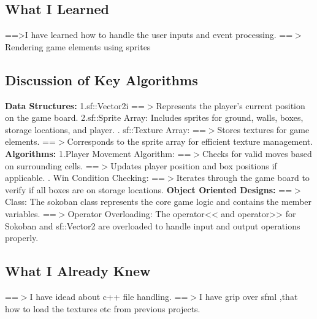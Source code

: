 \documentclass[12pt]{article}
\begin{document}
\subsection{What I Learned}
==>I have learned how to handle the user inputs and event processing.
\newline
==$>$Rendering game elements using sprites
\subsection{Discussion of Key Algorithms}
\textbf{Data Structures:}
\newline
1.sf::Vector2i 
\newline
==$>$Represents the player's current position on the game board.
\newline
2.sf::Sprite Array:
\newline
Includes sprites for ground, walls, boxes, storage locations, and player.
. sf::Texture Array:
\newline
==$>$Stores textures for game elements.
\newline
==$>$Corresponds to the sprite array for efficient texture management.
\newline
\textbf{Algorithms:}
\newline
1.Player Movement Algorithm:
\newline
==$>$Checks for valid moves based on surrounding cells.
\newline
==$>$Updates player position and box positions if applicable.
. Win Condition Checking:
\newline
==$>$Iterates through the game board to verify if all boxes are on storage locations.
\newline
\textbf{Object Oriented Designs:}
\newline
==$>$Class:
\newline
The sokoban class represents the core game logic and contains the member variables.
\newline
==$>$Operator Overloading:
\newline
The operator<< and operator>> for Sokoban and sf::Vector2 are overloaded to handle input and output operations properly.
\subsection{What I Already Knew}
==$>$I have idead about c++ file handling.
\newline
==$>$I have grip over sfml ,that how to load the textures etc from previous projects.
\end{document}
